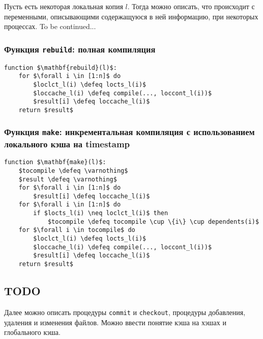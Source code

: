 Пусть есть некоторая локальная копия $l$. Тогда можно описать, что происходит с переменными, описывающими содержащуюся в ней информацию, при некоторых процессах.
To be continued...\\

\subsubsection{Функция \texttt{rebuild}: полная компиляция}
\begin{lstlisting}
function $\mathbf{rebuild}(l)$:
	for $\forall i \in [1:n]$ do
		$loclct_l(i) \defeq locts_l(i)$
		$loccache_l(i) \defeq compile(..., loccont_l(i))$
		$result[i] \defeq loccache_l(i)$
	return $result$
\end{lstlisting}

\subsubsection{Функция \texttt{make}: инкрементальная компиляция с использованием локального кэша на timestamp}
\begin{lstlisting}
function $\mathbf{make}(l)$:
	$tocompile \defeq \varnothing$
	$result \defeq \varnothing$
	for $\forall i \in [1:n]$ do
		$result[i] \defeq loccache_l(i)$
	for $\forall i \in [1:n]$ do
		if $locts_l(i) \neq loclct_l(i)$ then
			$tocompile \defeq tocompile \cup \{i\} \cup dependents(i)$
	for $\forall i \in tocompile$ do
		$loclct_l(i) \defeq locts_l(i)$
		$loccache_l(i) \defeq compile(..., loccont_l(i))$
		$result[i] \defeq loccache_l(i)$
	return $result$
\end{lstlisting}

\subsection{TODO}
Далее можно описать процедуры \texttt{commit} и \texttt{checkout}, процедуры добавления, удаления и изменения файлов. Можно ввести понятие кэша на хэшах и глобального кэша.
